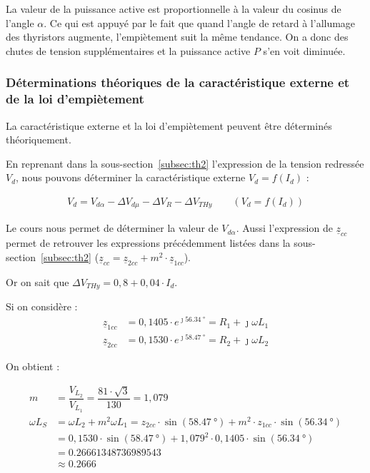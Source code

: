 \documentclass[a4paper, 11pt, openany, oneside, french]{article}
\begin{document}
La valeur de la puissance active est proportionnelle à la valeur du cosinus de l'angle $\alpha$. Ce qui est appuyé par le fait que quand l'angle de retard à l'allumage des thyristors augmente, l'empiètement suit la même tendance. On a donc des chutes de tension supplémentaires et la puissance active $P$ s'en voit diminuée.

\clearpage
\subsubsection{Déterminations théoriques de la caractéristique externe et de la loi d'empiètement}

La caractéristique externe et la loi d'empiètement peuvent être déterminés théoriquement.

En reprenant dans la sous-section~\ref{subsec:th2} l'expression de la tension redressée $V_d$, nous pouvons déterminer la caractéristique externe $V_d = f\left(I_d\right)$ :

\begin{align*}
    V_d = V_{d\alpha} - \Delta V_{d\mu} - \Delta V_R - \Delta V_{THy} \qquad \left(V_d = f\left(I_d\right)\right)
\end{align*}

Le cours nous permet de déterminer la valeur de $V_{d\alpha}$. Aussi l'expression de $\underline{z}_{cc}$ permet de retrouver les expressions précédemment listées dans la sous-section~\ref{subsec:th2} ($\underline{z}_{cc}=\underline{z}_{2cc} + m^2 \cdot \underline{z}_{1cc}$).

Or on sait que $\Delta V_{THy} = 0,8 + 0,04 \cdot I_d$.

Si on considère :
\begin{align*}
    \underline{z}_{1cc} &= 0,1405 \cdot e^{\jmath \SI{56.34}{\degree}} = R_1 + \jmath \omega L_1\\
    \underline{z}_{2cc} &= 0,1530 \cdot e^{\jmath \SI{58.47}{\degree}} = R_2 + \jmath \omega L_2
\end{align*}

On obtient :

\begin{align*}
    m &= \dfrac{V_{L_2}}{V_{L_1}} = \dfrac{81 \cdot \sqrt{3}}{130} = 1,079 \\
    \omega L_S &= \omega L_2 + m^2 \omega L_1 = z_{2cc} \cdot \sin{\left(\SI{58,47}{\degree}\right)} + m^2 \cdot z_{1cc} \cdot \sin{\left(\SI{56,34}{\degree}\right)}\\
    &= 0,1530 \cdot \sin{\left(\SI{58,47}{\degree}\right)} + 1,079^2 \cdot 0,1405 \cdot \sin{\left(\SI{56,34}{\degree}\right)} \\
    &= \SI{0,26661348736989543}{} \\
    &\approx \SI{0,2666}{}
\end{align*}
\end{document}
